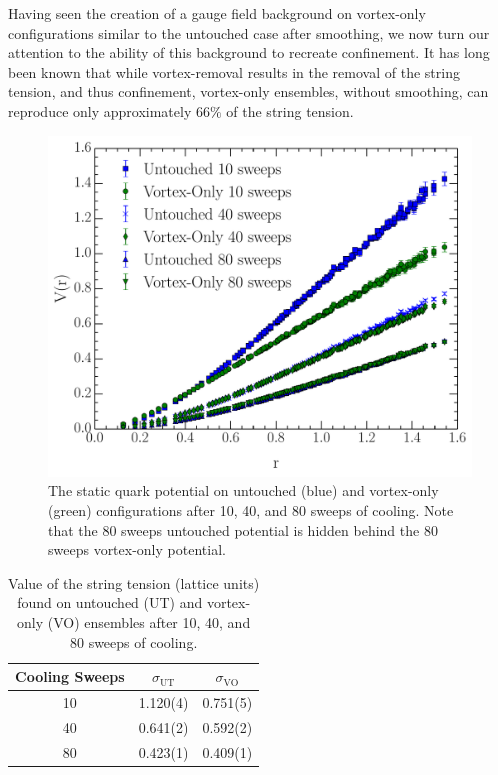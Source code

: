 \documentclass[
 reprint,
 amsmath,amssymb,
 aps,
prd,
]{revtex4-1}
\begin{document}
Having seen the creation of a gauge field background on vortex-only configurations similar to the untouched case after smoothing, we now turn our attention to the ability of this background to recreate confinement. It has long been known \cite{Langfeld:2003ev,Stack:2002sy} that while vortex-removal results in the removal of the string tension, and thus confinement, vortex-only ensembles, without smoothing, can reproduce only approximately $66\%$ of the string tension.\par
\begin{figure}[thpb]
\includegraphics[width=\columnwidth]{SQPc.pdf}
\caption{The static quark potential on untouched (blue) and vortex-only (green) configurations after 10, 40, and 80 sweeps of cooling. Note that the 80 sweeps untouched potential is hidden behind the 80 sweeps vortex-only potential.}
\label{Fig:SQPc}
\end{figure}
\begin{table}[b]
\caption{Value of the string tension (lattice units) found on untouched (UT) and vortex-only (VO) ensembles after 10, 40, and 80 sweeps of cooling.}
\begin{tabular}{ ccc }
Cooling Sweeps & $\sigma_{\mathrm{UT}}$ & $\sigma_{\mathrm{VO}}$ \\
\hline
10 & 1.120(4) & 0.751(5) \\
40 & 0.641(2) & 0.592(2) \\
80 & 0.423(1) & 0.409(1) \\
\end{tabular}
\label{Tab:SQPc}
\end{table}
\end{document}
